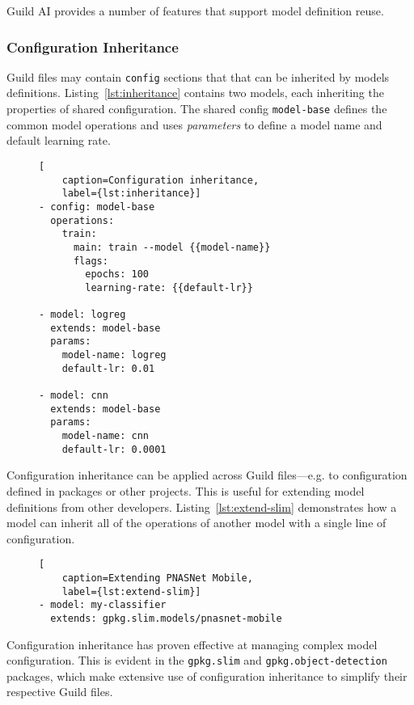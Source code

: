 \documentclass{article}
\begin{document}
Guild AI provides a number of features that support model definition
reuse.

\subsubsection{Configuration Inheritance}

Guild files may contain \verb|config| sections that that can be
inherited by models definitions. Listing~\ref{lst:inheritance}
contains two models, each inheriting the properties of shared
configuration. The shared config \verb|model-base| defines the common
model operations and uses \emph{parameters} to define a model name and
default learning rate.

\begin{figure}
\begin{lstlisting}[
    caption=Configuration inheritance,
    label={lst:inheritance}]
- config: model-base
  operations:
    train:
      main: train --model {{model-name}}
      flags:
        epochs: 100
        learning-rate: {{default-lr}}

- model: logreg
  extends: model-base
  params:
    model-name: logreg
    default-lr: 0.01

- model: cnn
  extends: model-base
  params:
    model-name: cnn
    default-lr: 0.0001
\end{lstlisting}
\end{figure}

Configuration inheritance can be applied across Guild files---e.g. to
configuration defined in packages or other projects. This is useful
for extending model definitions from other
developers. Listing~\ref{lst:extend-slim} demonstrates how a model can
inherit all of the operations of another model with a single line of
configuration.

\begin{figure}
\begin{lstlisting}[
    caption=Extending PNASNet Mobile,
    label={lst:extend-slim}]
- model: my-classifier
  extends: gpkg.slim.models/pnasnet-mobile
\end{lstlisting}
\end{figure}

Configuration inheritance has proven effective at managing complex
model configuration. This is evident in the \verb|gpkg.slim| and
\verb|gpkg.object-detection| packages, which make extensive use of
configuration inheritance to simplify their respective Guild files.

\iffalse
\end{document}
